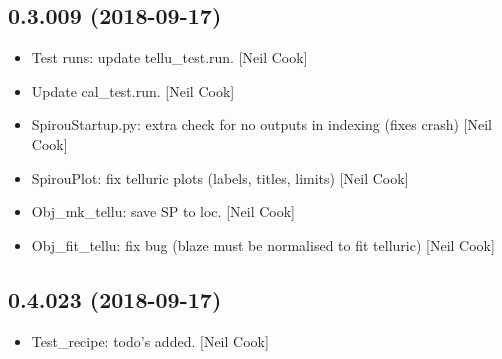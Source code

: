 \documentclass[a4paper,10pt,english]{report}
\begin{document}
\subsection{0.3.009 (2018-09-17)}
\label{\detokenize{misc/changelog:id321}}\begin{itemize}
\item {} 
Test runs: update tellu\_test.run. {[}Neil Cook{]}

\item {} 
Update cal\_test.run. {[}Neil Cook{]}

\item {} 
SpirouStartup.py: extra check for no outputs in indexing (fixes crash)
{[}Neil Cook{]}

\item {} 
SpirouPlot: fix telluric plots (labels, titles, limits) {[}Neil Cook{]}

\item {} 
Obj\_mk\_tellu: save SP to loc. {[}Neil Cook{]}

\item {} 
Obj\_fit\_tellu: fix bug (blaze must be normalised to fit telluric)
{[}Neil Cook{]}

\end{itemize}


\subsection{0.4.023 (2018-09-17)}
\label{\detokenize{misc/changelog:id322}}\begin{itemize}
\item {} 
Test\_recipe: todo’s added. {[}Neil Cook{]}

\end{itemize}
\end{document}
